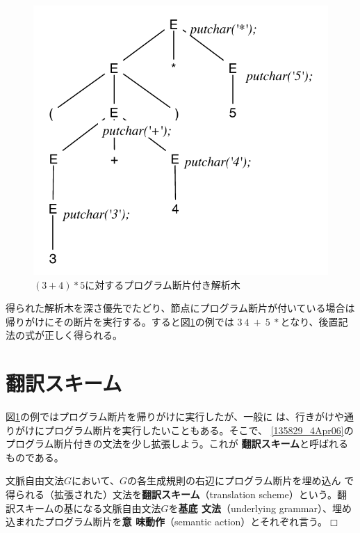 \begin{figure}
 \begin{center}
  \includegraphics{figure/parse_tree_with_program.pdf}
 \end{center}
 \caption{$(3+4)*5$に対するプログラム断片付き解析木}
 \label{142037_4Apr06}
\end{figure}

得られた解析木を深さ優先でたどり、節点にプログラム断片が付いている場合は
帰りがけにその断片を実行する。すると図\ref{142037_4Apr06}の例では
$3~4~+~5~*$となり、後置記法の式が正しく得られる。

\section{翻訳スキーム}
\label{195223_17Apr06}

図\ref{142037_4Apr06}の例ではプログラム断片を帰りがけに実行したが、一般に
は、行きがけや通りがけにプログラム断片を実行したいこともある。そこで、
\eqref{135829_4Apr06}のプログラム断片付きの文法を少し拡張しよう。これが
{\bfseries 翻訳スキーム}と呼ばれるものである。

\begin{definition}
 文脈自由文法$G$において、$G$の各生成規則の右辺にプログラム断片を埋め込ん
 で得られる（拡張された）文法を{\bfseries 翻訳スキーム}（translation
 scheme）という。翻訳スキームの基になる文脈自由文法$G$を{\bfseries 基底
 文法}（underlying grammar）、埋め込まれたプログラム断片を{\bfseries 意
 味動作}（semantic action）とそれぞれ言う。$\Box$
\end{definition}

